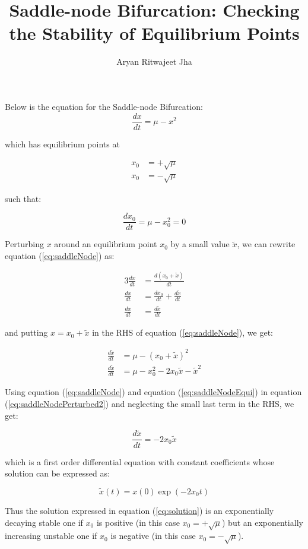 \documentclass{article}
\begin{document}
	\title{Saddle-node Bifurcation: Checking the Stability of Equilibrium Points}
	\author{Aryan Ritwajeet Jha}
	\maketitle
	
Below is the equation for the Saddle-node Bifurcation: 
	\begin{equation}
		\label{eq:saddleNode}
		\frac{dx}{dt} = \mu - x^2
	\end{equation}
	
which has equilibrium points at
	
	\begin{align*}
		x_0 &= +\sqrt\mu \\
		x_0 &= -\sqrt\mu
	\end{align*} 

such that:
	
	\begin{equation}
		\label{eq:saddleNodeEqui}
		\frac{dx_0}{dt} = \mu - x_0^2 = 0 
	\end{equation}
	
	
Perturbing $x$ around an equilibrium point $x_0$ by a small value $\tilde x$, we can rewrite equation (\ref{eq:saddleNode}) as:
	
	\begin{alignat}{3}
		\label{eq:saddleNodePerturbed}
		\frac{dx}{dt} &= \frac{d(x_0 + \tilde x)}{dt} \\
		\frac{dx}{dt} &= \frac{dx_0}{dt} + \frac{d \tilde x}{dt} \\
		\frac{dx}{dt} &= \frac{d \tilde x}{dt} 
	\end{alignat}

and putting $x = x_0 + \tilde x$ in the RHS of equation (\ref{eq:saddleNode}), we get:
	
	\begin{align}
		\label{eq:saddleNodePerturbed2}
		\frac{d\tilde x}{dt} &= \mu - (x_0+\tilde x)^2 \\
		\frac{d\tilde x}{dt} &= \mu - x_0^2 -2x_0\tilde x - \tilde x^2
	\end{align}
	
Using equation (\ref{eq:saddleNode}) and equation (\ref{eq:saddleNodeEqui}) in equation (\ref{eq:saddleNodePerturbed2}) and neglecting the small last term in the RHS, we get:
	
	\begin{equation}
		\frac{d\tilde x}{dt} = -2x_0\tilde x
	\end{equation}

which is a first order differential equation with constant coefficients whose solution can be expressed as:

	\begin{equation}
		\label{eq:solution}
		\tilde{x}(t) = x(0)\exp{(-2x_0t)} 
	\end{equation}

Thus the solution expressed in equation (\ref{eq:solution}) is an exponentially decaying stable one if $x_0$ is positive (in this case $x_0 = +\sqrt{\mu}$) but an exponentially increasing unstable one if $x_0$ is negative (in this case $x_0 = -\sqrt{\mu}$).
\end{document}
